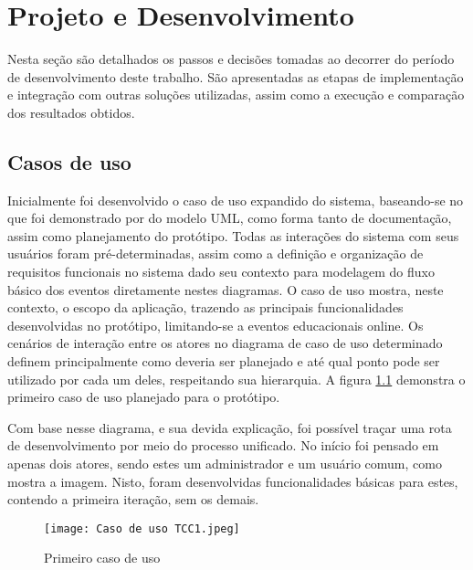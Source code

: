 \chapter{Projeto e Desenvolvimento}\label{chp:LABEL_CHP_4}
Nesta seção são detalhados os passos e decisões tomadas ao decorrer do período de desenvolvimento deste trabalho. São apresentadas as etapas de implementação e integração com outras soluções utilizadas, assim como a execução e comparação dos resultados obtidos.

\section{Casos de uso}
Inicialmente foi desenvolvido o caso de uso expandido do sistema, baseando-se no que foi demonstrado por  do modelo UML, como forma tanto de documentação, assim como planejamento do protótipo. Todas as interações do sistema com seus usuários foram pré-determinadas, assim como a definição e organização de requisitos funcionais no sistema dado seu contexto para modelagem do fluxo básico dos eventos diretamente nestes diagramas. O caso de uso mostra, neste contexto, o escopo da aplicação, trazendo as principais funcionalidades desenvolvidas no protótipo, limitando-se a eventos educacionais online. Os cenários de interação entre os atores no diagrama de caso de uso determinado definem principalmente como deveria ser planejado e até qual ponto pode ser utilizado por cada um deles, respeitando sua hierarquia. A figura \ref{caso_uso_1} demonstra o primeiro caso de uso planejado para o protótipo.

Com base nesse diagrama, e sua devida explicação, foi possível traçar uma rota de desenvolvimento por meio do processo unificado. No início foi pensado em apenas dois atores, sendo estes um administrador e um usuário comum, como mostra a imagem. Nisto, foram desenvolvidas funcionalidades básicas para estes, contendo a primeira iteração, sem os demais. 

\begin{figure}[H]
    \caption{\label{caso_uso_1}Primeiro caso de uso}
    \vspace{5pt}
    \centering
    \texttt{[image: Caso de uso TCC1.jpeg]}
    \vspace{5pt}
\end{figure}


